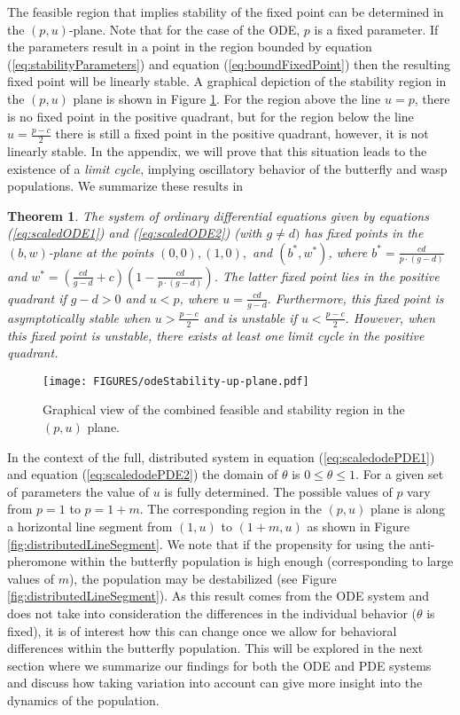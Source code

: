 \documentclass[review,authoryear]{elsarticle}
\newtheorem{theorem}{Theorem}[section]
\begin{document}
The feasible region that implies stability of the fixed point can be
determined in the $(p,u)$-plane. Note that for the case of the ODE, $p$ is a fixed parameter. If the parameters result in a point in
the region bounded by equation (\ref{eq:stabilityParameters}) and
equation (\ref{eq:boundFixedPoint}) then the resulting
fixed point will be linearly stable. A graphical depiction of the
stability region in the $(p,u)$ plane is shown in Figure
\ref{fig:uvStabilityRegion}. For the region above the line $u=p$, there is no fixed point in the positive quadrant, but for the region below the line $u = \frac{p-c}{2}$ there is still  a fixed point in the positive quadrant, however, it is not linearly stable.  In the appendix, we will prove that this situation leads to the existence of a \emph{limit cycle}, implying oscillatory behavior of the butterfly and wasp populations. We summarize these results in 

\begin{theorem}  The system of ordinary differential equations given by equations (\ref{eq:scaledODE1}) and (\ref{eq:scaledODE2}) (with $g\ne d)$ has fixed points in the $(b,w)$-plane at the points $(0,0), (1,0),$ and $(b^*,w^*)$, where $b^*=\frac{cd}{p\cdot (g-d)}$ and
$w^*=\left(\frac{cd}{g-d}+c\right)\left(1-\frac{cd}{p\cdot (g-d)}\right)$.  The latter fixed point lies in the positive quadrant if $g-d>0$ and $u<p$, where $u=\frac{cd}{g-d}.$
Furthermore, this fixed point is asymptotically stable when $u>\frac{p-c}{2}$ and is unstable if $u<\frac{p-c}{2}.$ However, when this fixed point is unstable, there exists at least one  limit cycle in the positive quadrant.

\end{theorem}

\begin{figure}[htb]
  \centering
  \texttt{[image: FIGURES/odeStability-up-plane.pdf]}
  \caption[Stability region in the $(p,u)$ plane.]{Graphical view of the
    combined feasible and stability region in the $(p,u)$ plane.}
  \label{fig:uvStabilityRegion}
\end{figure}

In the context of the full, distributed system in equation
(\ref{eq:scaledodePDE1}) and equation (\ref{eq:scaledodePDE2}) the
domain of $\theta$ is $0\leq\theta\leq 1$. For a given set of
parameters the value of $u$ is fully determined. The possible values of $p$
vary from $p=1$ to $p=1+m$.  The corresponding region in the $(p,u)$
plane is along a horizontal line segment from $(1,u)$ to
$(1+m,u)$ as shown in Figure \ref{fig:distributedLineSegment}. We note that if the propensity for using the anti-pheromone within the butterfly population is high enough (corresponding to large values of $m$), the population may be destabilized (see Figure \ref{fig:distributedLineSegment}). As this result comes from the ODE system and does not take into consideration the differences in the individual behavior ($\theta$ is fixed), it is of interest how this can change once we allow for behavioral differences within the butterfly population. This will be explored in the next section where we summarize our findings for both the ODE and PDE systems and discuss how taking variation into account can give more insight into the dynamics of the population. 
\end{document}
